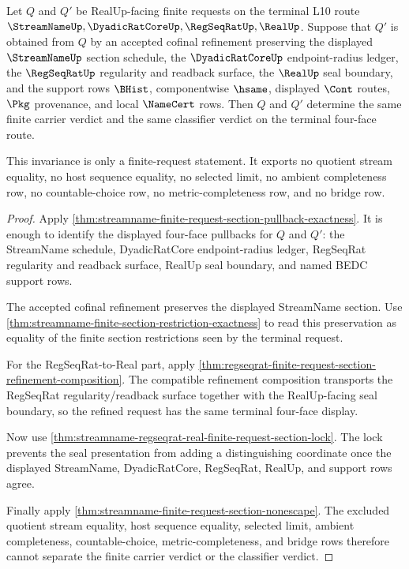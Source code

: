 \begin{theorem}
\label{thm:streamname-finite-request-section-cofinal-verdict-invariance}
Let $Q$ and $Q'$ be RealUp-facing finite requests on the terminal L10 route
$\StreamNameUp,\DyadicRatCoreUp,\RegSeqRatUp,\RealUp$. Suppose that $Q'$ is
obtained from $Q$ by an accepted cofinal refinement preserving the displayed
$\StreamNameUp$ section schedule, the $\DyadicRatCoreUp$ endpoint-radius
ledger, the $\RegSeqRatUp$ regularity and readback surface, the $\RealUp$ seal
boundary, and the support rows $\BHist$, componentwise $\hsame$, displayed
$\Cont$ routes, $\Pkg$ provenance, and local $\NameCert$ rows. Then $Q$ and
$Q'$ determine the same finite carrier verdict and the same classifier verdict
on the terminal four-face route.

This invariance is only a finite-request statement. It exports no quotient
stream equality, no host sequence equality, no selected limit, no ambient
completeness row, no countable-choice row, no metric-completeness row, and no
bridge row.
\end{theorem}
\begin{proof}
Apply
\autoref{thm:streamname-finite-request-section-pullback-exactness}. It is
enough to identify the displayed four-face pullbacks for $Q$ and $Q'$: the
StreamName schedule, DyadicRatCore endpoint-radius ledger, RegSeqRat
regularity and readback surface, RealUp seal boundary, and named BEDC support
rows.

The accepted cofinal refinement preserves the displayed StreamName section.
Use \autoref{thm:streamname-finite-section-restriction-exactness} to read this
preservation as equality of the finite section restrictions seen by the
terminal request.

For the RegSeqRat-to-Real part, apply
\autoref{thm:regseqrat-finite-request-section-refinement-composition}. The
compatible refinement composition transports the RegSeqRat regularity/readback
surface together with the RealUp-facing seal boundary, so the refined request
has the same terminal four-face display.

Now use
\autoref{thm:streamname-regseqrat-real-finite-request-section-lock}. The lock
prevents the seal presentation from adding a distinguishing coordinate once
the displayed StreamName, DyadicRatCore, RegSeqRat, RealUp, and support rows
agree.

Finally apply \autoref{thm:streamname-finite-request-section-nonescape}. The
excluded quotient stream equality, host sequence equality, selected limit,
ambient completeness, countable-choice, metric-completeness, and bridge rows
therefore cannot separate the finite carrier verdict or the classifier verdict.
\end{proof}

